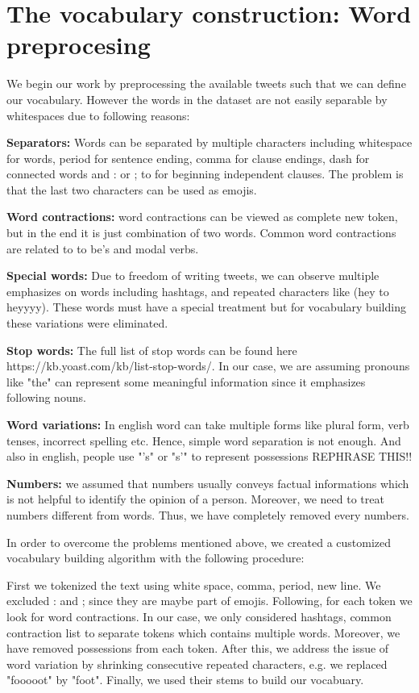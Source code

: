 \documentclass[10pt,conference,compsocconf]{IEEEtran}
\begin{document}
\section{The vocabulary construction: Word preprocesing}\label{s1}

We begin our work by preprocessing the available tweets such that we can define our vocabulary. However the words in the dataset are not easily separable by whitespaces due to following reasons:
	
	\textbf{Separators:} Words can be separated by multiple characters including whitespace for words, period for sentence ending, comma for clause endings, dash for connected words and : or ; to for beginning independent clauses. The problem is that the last two characters can be used as emojis. 

\textbf{Word contractions:} word contractions can be viewed as complete new token, but in the end it is just combination of two words. Common word contractions are related to to be's and modal verbs.

\textbf{Special words:} Due to freedom of writing tweets, we can observe multiple emphasizes on words including hashtags, and repeated characters like (hey to heyyyy). These words must have a special treatment but for vocabulary building these variations were eliminated.

\textbf{Stop words:} The full list of stop words can be found here https://kb.yoast.com/kb/list-stop-words/. In our case, we are assuming pronouns like "the" can represent some meaningful information since it emphasizes following nouns.

\textbf{Word variations:} In english word can take multiple forms like plural form, verb tenses, incorrect spelling etc. Hence, simple word separation is not enough. And also in english, people use "'s" or "s'" to represent possessions REPHRASE THIS!! 

\textbf{Numbers:} we assumed that numbers usually conveys factual informations which is not helpful to identify the opinion of a person. Moreover, we need to treat numbers different from words. Thus, we have completely removed every numbers.

In order to overcome the problems mentioned above, we created a customized vocabulary building algorithm with the following procedure:

First we tokenized the text using white space, comma, period, new line. We excluded : and ; since they are maybe part of emojis.
Following, for each token we look for word contractions. In our case, we only considered hashtags, common contraction list to separate tokens which contains multiple words. Moreover, we have removed possessions from each token.
After this, we address the issue of word variation by shrinking consecutive repeated characters, e.g. we replaced "fooooot" by "foot". Finally, we used their stems to build our vocabuary.
\end{document}
